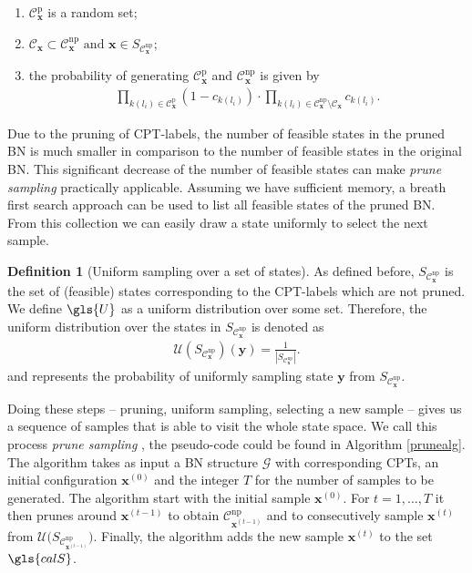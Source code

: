 \documentclass[a4paper, twoside, 11pt]{report}
\newcommand{\bfx}{{\mathbf{x}}}
\newcommand{\C}{{\mathcal C}}
\newcommand{\U}{{\mathcal{U}}}
\theoremstyle{plain}
\theoremstyle{definition}
\newtheorem{definition}[thm]{Definition}
\theoremstyle{remark}
\newcommand{\G}{{\mathcal G}}
\newcommand{\ps}{\textit{prune sampling }}
\newcommand{\bfy}{{\mathbf{y}}}
\begin{document}
\begin{enumerate}
\item $\C_\bfx^{\text{p}}$ is a random set;
\item $\C_\bfx \subset \C_\bfx^{\text{np}} \text{ and } \bfx \in S_{\C_\bfx^{\text{np}}}$;
\item the probability of generating $\C_\bfx^{\text{p}}$ and $\C_\bfx^{\text{np}}$ is given by
\begin{align*}
\prod_{k(l_i) \in \C_\bfx^{\text{p}}}(1-c_{k(l_i)}) \cdot \prod_{k(l_i) \in \C_\bfx^{\text{np}} \setminus \C_{\bfx}} c_{k(l_i)}.
\end{align*}
\end{enumerate}
Due to the pruning of CPT-labels, the number of feasible states in the pruned BN is much smaller in comparison to the number of feasible states in the original BN. This significant decrease of the number of feasible states can make \ps practically applicable. Assuming we have sufficient memory, a breath first search approach can be used to list all feasible states of the pruned BN. From this collection we can easily draw a state uniformly to select the next sample.

\begin{definition}[Uniform sampling over a set of states]
As defined before, $S_{\C_\bfx^{\text{np}}}$ is the set of (feasible) states corresponding to the CPT-labels which are not pruned. We define $\gls{U}$ as a uniform distribution over some set. Therefore, the uniform distribution over the states in $S_{\C_\bfx^{\text{np}}}$ is denoted as
\begin{align*}
\U(S_{\C_\bfx^{\text{np}}})(\bfy) = \frac{1}{|S_{\C_\bfx^{\text{np}}}|}.
\end{align*}
and represents the probability of uniformly sampling state $\bfy$ from $S_{\C_\bfx^{\text{np}}}$.
\end{definition}
Doing these steps -- pruning, uniform sampling, selecting a new sample --  gives us a sequence of samples that is able to visit the whole state space. We call this process \ps, the pseudo-code could be found in Algorithm \ref{prunealg}. The algorithm takes as input a BN structure $\G$ with corresponding CPTs, an initial configuration $\bfx^{(0)}$ and the integer $T$ for the number of samples to be generated. The algorithm start with the initial sample $\bfx^{(0)}$. For $t = 1, \ldots , T$ it then prunes around $\bfx^{(t-1)}$ to obtain $\C_{\bfx^{(t-1)}}^{\text{np}}$ and to consecutively sample $\bfx^{(t)}$ from $\U\big( S_{\C_{\bfx^{(t-1)}}^{\text{np}}} \big)$. Finally, the algorithm adds the new sample $\bfx^{(t)}$ to the set $\gls{calS}$.  \\
\end{document}
